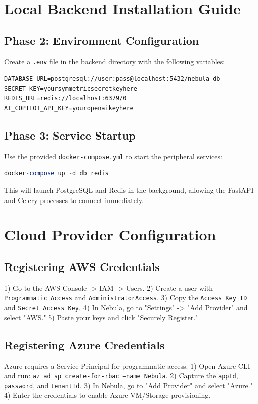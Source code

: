 \section{Local Backend Installation Guide}

\subsection{Phase 2: Environment Configuration}
Create a \texttt{.env} file in the backend directory with the following variables:
\begin{lstlisting}[language=XML]
DATABASE_URL=postgresql://user:pass@localhost:5432/nebula_db
SECRET_KEY=yoursymmetricsecretkeyhere
REDIS_URL=redis://localhost:6379/0
AI_COPILOT_API_KEY=youropenaikeyhere
\end{lstlisting}

\subsection{Phase 3: Service Startup}
Use the provided \texttt{docker-compose.yml} to start the peripheral services:
\begin{lstlisting}[language=SQL]
docker-compose up -d db redis
\end{lstlisting}
This will launch PostgreSQL and Redis in the background, allowing the FastAPI and Celery processes to connect immediately.

\section{Cloud Provider Configuration}

\subsection{Registering AWS Credentials}
1) Go to the AWS Console -> IAM -> Users.
2) Create a user with \texttt{Programmatic Access} and \texttt{AdministratorAccess}.
3) Copy the \texttt{Access Key ID} and \texttt{Secret Access Key}.
4) In Nebula, go to "Settings" -> "Add Provider" and select "AWS."
5) Paste your keys and click "Securely Register."

\subsection{Registering Azure Credentials}
Azure requires a Service Principal for programmatic access.
1) Open Azure CLI and run: \texttt{az ad sp create-for-rbac --name Nebula}.
2) Capture the \texttt{appId}, \texttt{password}, and \texttt{tenantId}.
3) In Nebula, go to "Add Provider" and select "Azure."
4) Enter the credentials to enable Azure VM/Storage provisioning.

